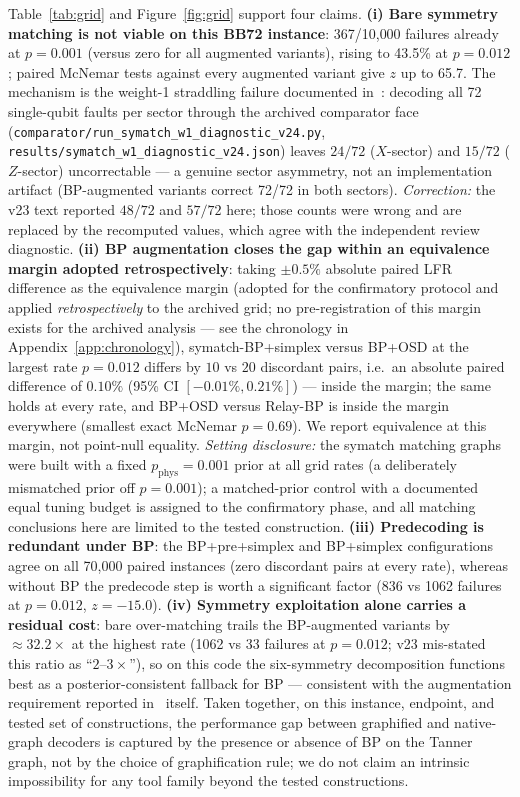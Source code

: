 \documentclass[11pt,a4paper]{article}
\begin{document}
Table~\ref{tab:grid} and Figure~\ref{fig:grid} support four claims.
\textbf{(i) Bare symmetry matching is not viable on this BB72 instance}:
367/10{,}000 failures already at $p=0.001$ (versus zero for all augmented
variants), rising to 43.5\% at $p=0.012$; paired McNemar tests against every
augmented variant give $z$ up to 65.7. The mechanism is the weight-1
straddling failure documented in~\cite{SahayBrown2026}: decoding all 72
single-qubit faults per sector through the archived comparator face
(\texttt{comparator/\allowbreak run\_symatch\_\allowbreak w1\_\allowbreak diagnostic\_\allowbreak v24.py},
\texttt{results/\allowbreak symatch\_\allowbreak w1\_\allowbreak diagnostic\_\allowbreak v24.json}) leaves $24/72$
($X$-sector) and $15/72$ ($Z$-sector) uncorrectable --- a genuine sector
asymmetry, not an implementation artifact (BP-augmented variants correct
72/72 in both sectors). \emph{Correction:} the v23 text reported $48/72$
and $57/72$ here; those counts were wrong and are replaced by the
recomputed values, which agree with the independent review diagnostic.
\textbf{(ii) BP augmentation closes the gap within an equivalence
margin adopted retrospectively}: taking $\pm0.5\%$ absolute paired LFR
difference as the equivalence margin (adopted for the confirmatory
protocol and applied \emph{retrospectively} to the archived grid; no
pre-registration of this margin exists for the archived analysis ---
see the chronology in Appendix~\ref{app:chronology}),
symatch-BP+simplex versus
BP+OSD at the largest rate $p=0.012$ differs by $10$ vs $20$ discordant
pairs, i.e.\ an absolute paired difference of $0.10\%$ (95\% CI
$[-0.01\%,0.21\%]$) --- inside the margin; the same holds at every rate,
and BP+OSD versus Relay-BP is inside the margin everywhere (smallest
exact McNemar $p=0.69$). We report equivalence at this margin, not
point-null equality. \emph{Setting disclosure:} the symatch matching
graphs were built with a fixed $p_{\mathrm{phys}}=0.001$ prior at all
grid rates (a deliberately mismatched prior off $p=0.001$); a
matched-prior control with a documented equal tuning budget is assigned
to the confirmatory phase, and all matching conclusions here are limited
to the tested construction.
\textbf{(iii) Predecoding is redundant under BP}: the BP+pre+simplex and
BP+simplex configurations agree on all 70{,}000 paired instances (zero
discordant pairs at every rate), whereas without BP the predecode step is
worth a significant factor (836 vs 1062 failures at $p=0.012$, $z=-15.0$).
\textbf{(iv) Symmetry exploitation alone carries a residual cost}: bare
over-matching trails the BP-augmented variants by $\approx\!32.2\times$
at the highest rate (1062 vs 33 failures at $p=0.012$; v23 mis-stated
this ratio as ``$2$--$3\times$''), so on this code the six-symmetry
decomposition functions best as a posterior-consistent fallback for BP ---
consistent with the augmentation requirement reported
in~\cite{SahayBrown2026} itself.
Taken together, on this instance, endpoint, and tested set of
constructions, the performance gap between graphified and
native-graph decoders is captured by the presence or absence of
BP on the Tanner graph, not by the choice of graphification rule; we do
not claim an intrinsic impossibility for any tool family beyond the
tested constructions.
\end{document}
